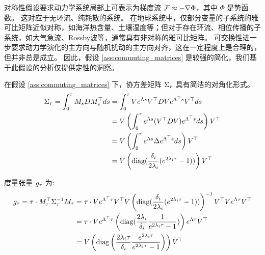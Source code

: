 对称性假设要求动力学系统局部上可表示为梯度流 $\mathcal{F} \approx -\nabla \Phi$，其中 $\Phi$ 是势函数。
这对应于无环流、纯耗散的系统。
在地球系统中，仅部分变量的子系统的雅可比矩阵近似对称，如海洋热含量、土壤湿度等；但对于存在环流、相位传播的子系统，如大气急流、Rossby波等，通常具有非对称的雅可比矩阵。
可交换性进一步要求动力学演化的主方向与随机扰动的主方向对齐，这在一定程度上是合理的，但并非总是成立。
因此，假设 \ref{ass:commuting_matrices} 是较强的简化，我们基于此假设的分析仅提供定性的洞察。

在假设 \ref{ass:commuting_matrices} 下，协方差矩阵 $\Sigma_{\tau}$ 具有简洁的对角化形式。
\begin{align*}
    \Sigma_{\tau} = \int_0^{\tau} M_s D M_s^\top ds &= \int_0^{\tau} V e^{\Lambda s} V^\top D V e^{\Lambda^\top s} V^\top ds \\
    &= V \left(\int_0^{\tau} e^{\Lambda s} (V^\top D V) e^{\Lambda^\top s} ds\right) V^\top \\
    &= V \left(\int_0^{\tau} e^{\Lambda s} \Delta e^{\Lambda^\top s} ds\right) V^\top \\
    &= V \left(\text{diag}(\frac{\delta_i}{2 \lambda_i} (e^{2 \lambda_i \tau} - 1))\right) V^\top
\end{align*}

度量张量 $g_{\tau}$ 为:
\begin{align*}
    g_{\tau} = \tau \cdot M_{\tau}^\top \Sigma_{\tau}^{-1} M_{\tau} &= \tau \cdot V e^{\Lambda^\top \tau} V^\top V \left(\text{diag}(\frac{\delta_i}{2 \lambda_i} (e^{2 \lambda_i \tau} - 1))\right)^{-1} V^\top V e^{\Lambda \tau} V^\top \\
    &= \tau \cdot V e^{\Lambda^\top \tau} \left(\text{diag}(\frac{2 \lambda_i}{\delta_i} \frac{1}{e^{2\lambda_i \tau} - 1})\right) e^{\Lambda \tau} V^\top \\
    &= V \left(\text{diag}\left(\frac{2 \lambda_i \tau}{\delta_i} \frac{e^{2\lambda_i \tau}}{e^{2\lambda_i \tau} - 1}\right)\right) V^\top
\end{align*}

